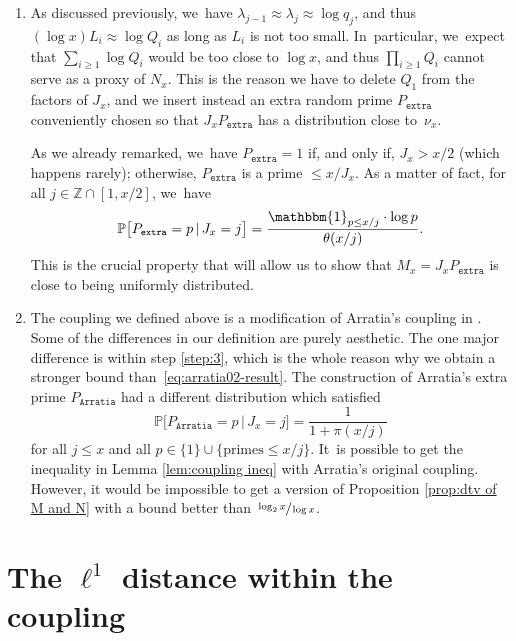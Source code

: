 \documentclass[JEP,XML,SOM,Unicode,published]{cedram}
\newenvironment{enumeratea}
{\bgroup\def\theenumi{\alph{enumi}}\begin{enumerate}}
{\end{enumerate}\egroup}
\newcommand{\ZZ}{\mathbb{Z}}
\newcommand{\PP}{\mathbb{P}}
\newcommand{\one}{\mathbbm{1}}
\newcommand{\pextra}{P_{\mathtt{extra}}}
\newcommand{\parratia}{P_{\mathtt{Arratia}}}
\newcommand{\bg}{\big}
\theoremstyle{plain}
\theoremstyle{definition}
\begin{document}
\begin{enumeratea}
\item\label{rem:couplinga}
As discussed previously, we~have $\lambda_{j-1}\approx \lambda_j\approx \log q_j$, and thus $(\log x)L_i \approx \log Q_i$ as long as $L_i$ is not too small. In~particular, we~expect that $\sum_{i \ge 1} \log Q_i$ would be too close to $\log x$, and thus $\prod_{i\ge1}Q_i$ cannot serve as a proxy of $N_x$. This is the reason we have to delete $Q_1$ from the factors of $J_x$, and we insert instead an extra random prime $\pextra$ conveniently chosen so that $J_x\pextra$ has a distribution close to~$\nu_x$.

As we already remarked, we~have $\pextra=1$ if, and only if, $J_x > x/2$ (which happens rarely); otherwise, $\pextra$ is a prime $\le x/J_x$. As a matter of fact, for all $j\in\ZZ\cap[1,x/2]$, we~have
\begin{equation}
\label{eq:distribution of Pextra}
\PP\bg[\pextra = p\,|\, J_x = j\bg] = \frac{\one_{p\le x/j}\cdot\log p}{\theta(x/j)}.
\end{equation}
This is the crucial property that will allow us to show that $M_x=J_x\pextra$ is close to being uniformly distributed.

\item\label{rem:couplingb}
The coupling we defined above is a modification of Arratia's coupling in \cite{Arratia02}. Some of the differences in our definition are purely aesthetic. The one major difference is within step \eqref{step:3}, which is the whole reason why we obtain a stronger bound than~\eqref{eq:arratia02-result}. The construction of Arratia's extra prime $\parratia$ had a different distribution which satisfied
\begin{equation}
\label{eq:extraprime-arratia}
\PP\bg[\parratia = p\,|\, J_x=j\bg] = \frac{1}{1+\pi(x/j)}
\end{equation}
for all $j\le x$ and all $p \in \{1\}\cup\{\text{primes}\le x/j\}$. It~is possible to get the inequality in Lemma \ref{lem:coupling ineq} with Arratia's original coupling. However, it would be impossible to get a version of Proposition \ref{prop:dtv of M and N} with a bound better than $\sfrac{\log_2x}{\log x}$.
\end{enumeratea}

\section{The \texorpdfstring{$\ell^1$}{l1} distance within the coupling}\label{sec:proof of Lemma coupling ineq}
\end{document}
